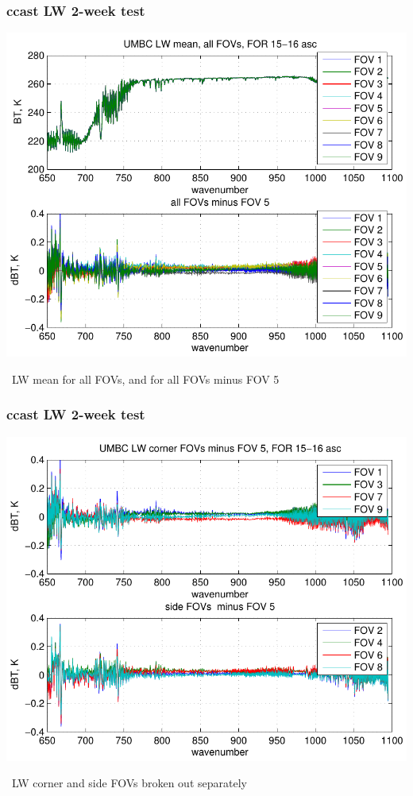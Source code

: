 \documentclass[11pt]{beamer}
\begin{document}
\begin{frame}
\frametitle{ccast LW 2-week test}

\begin{center}
  \includegraphics[scale=0.6]{umbc_LW_avg_5-18_Mar.pdf}
\end{center}

\ccast\ LW mean for all FOVs, and for all FOVs minus FOV 5

\end{frame}
\begin{frame}
\frametitle{ccast LW 2-week test}

\begin{center}
  \includegraphics[scale=0.6]{umbc_LW_dif_5-18_Mar.pdf}
\end{center}

\ccast\ LW corner and side FOVs broken out separately

\end{frame}
\end{document}
